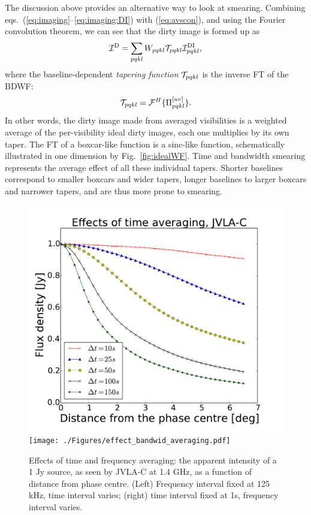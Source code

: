 \documentclass[useAMS,usenatbib]{mn2e}
\begin{document}
The discussion above provides an alternative way to look at smearing. Combining eqs.~(\ref{eq:imaging}--\ref{eq:imaging:DI}) with 
(\ref{eq:avscon}), and using the Fourier convolution theorem, we can see that the dirty image is formed up as
\begin{equation}
\mathcal{I}^\mathrm{D} =  \sum_{pqkl} W_{pqkl}  \mathcal{T}_{pqkl} \mathcal{I}^\mathrm{DI}_{pqkl},
\end{equation}
where the baseline-dependent \emph{tapering function} $\mathcal{T}_{pqkl}$ is the inverse FT of the BDWF:
\begin{equation}
\mathcal{T}_{pqkl} = \mathcal{F}^H\{ \Pi^{[uv]}_{pqkl} \}.
\end{equation}
In other words, the dirty image made from averaged visibilities is a weighted average of the per-visibility ideal dirty images, 
each one multiplies by its own taper. The FT of a boxcar-like function is a sinc-like function, schematically illustrated in one
dimension by Fig.~\ref{fig:idealWF}. Time and bandwidth smearing represents the average effect 
of all these individual tapers. Shorter baselines correspond to smaller boxcars and wider tapers, longer baselines to larger 
boxcars and narrower tapers, and are thus more prone to smearing.

\begin{figure}
\includegraphics[width=\columnwidth]{./Figures/effect_time_averaging.pdf}%
\texttt{[image: ./Figures/effect\_bandwid\_averaging.pdf]}
\caption{Effects of time and frequency averaging: the apparent intensity of a 1 Jy source, as seen by JVLA-C at 1.4 GHz, 
as a function of distance from phase centre. (Left) Frequency interval fixed at 125 kHz, time interval varies; 
(right) time interval fixed at 1s, frequency interval varies.}\label{fig:smear}
\end{figure}
\end{document}

